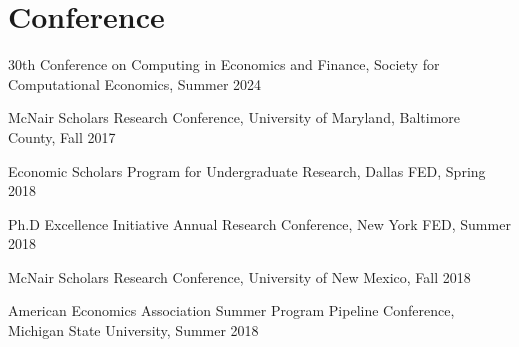 
\section{Conference} %
\label{sec:conference}
\vspace{-0.25in}
\begin{outerlist}
    \item 30th Conference on Computing in Economics and Finance, Society for Computational Economics, Summer 2024
    \item McNair Scholars Research Conference, University of Maryland, Baltimore County, Fall 2017
    \item Economic Scholars Program for Undergraduate Research, Dallas FED, Spring 2018
    \item Ph.D Excellence Initiative Annual Research Conference, New York FED, Summer 2018
    \item McNair Scholars Research Conference, University of New Mexico, Fall 2018
    \item American Economics Association Summer Program Pipeline Conference, Michigan State University, Summer 2018
\end{outerlist}

